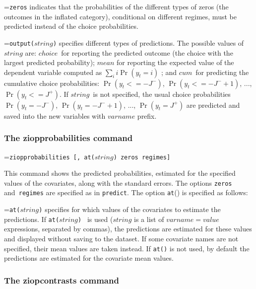 \documentclass[letterpaper,fleqn,12pt]{article}
\begin{document}
\medskip 

\hangindent=\parindent\noindent \texttt{zeros} indicates that the
probabilities of the different types of zeros (the outcomes in the inflated
category), conditional on different regimes, must be predicted instead of
the choice probabilities.

\smallskip

\hangindent=\parindent\noindent \texttt{output($string$)} specifies
different types of predictions. The possible values of \texttt{$string$}
are: \texttt{$choice$}\ for reporting the predicted outcome (the choice with
the largest predicted probability); \texttt{$mean$} for reporting the
expected value of the dependent variable computed as $\sum_{i}i\Pr (y_{t}=i)$%
; and \texttt{$cum$}\ for predicting the cumulative choice probabilities: $%
\Pr (y_{t}<=-J^{-})$, $\Pr (y_{t}<=-J^{-}+1)$, ..., $\Pr (y_{t}<=J^{+})$. If 
\texttt{$string$ }is not specified, the usual choice probabilities $\Pr
(y_{t}=-J^{-})$, $\Pr (y_{t}=-J^{-}+1)$, ..., $\Pr (y_{t}=J^{+})$ are
predicted and saved into the new variables with \texttt{$varname$} prefix.

\subsubsection*{The ziopprobabilities command}

\hangindent=\parindent\noindent \texttt{ziopprobabilities [, at($string$)
zeros regimes]}

\smallskip 

This command shows the predicted probabilities, estimated for the specified
values of the covariates, along with the standard errors. The options 
\texttt{zeros} and\texttt{\ regimes} are specified as in \texttt{predict}.
The option \texttt{at}() is specified as follows:\smallskip

\hangindent=\parindent\noindent \texttt{at($string$)} specifies for which
values of the covariates to estimate the predictions. If \texttt{at($string$)%
} is used (\texttt{$string$} is a list of \texttt{$varname=value$}
expressions, separated by commas), the predictions are estimated for these
values and displayed without saving to the dataset. If some covariate names
are not specified, their mean values are taken instead. If \texttt{at()} is
not used, by default the predictions are estimated for the covariate mean
values.

\subsubsection*{The ziopcontrasts command}
\end{document}
